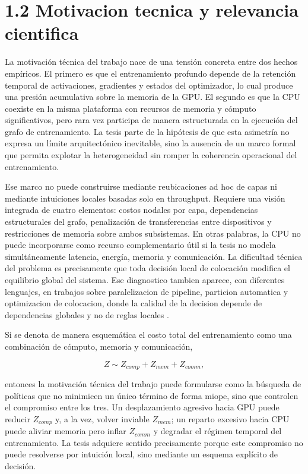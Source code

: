 \section{1.2 Motivacion tecnica y relevancia cientifica}
La motivación técnica del trabajo nace de una tensión concreta entre dos hechos empíricos. El primero es que el entrenamiento profundo depende de la retención temporal de activaciones, gradientes y estados del optimizador, lo cual produce una presión acumulativa sobre la memoria de la GPU. El segundo es que la CPU coexiste en la misma plataforma con recursos de memoria y cómputo significativos, pero rara vez participa de manera estructurada en la ejecución del grafo de entrenamiento. La tesis parte de la hipótesis de que esta asimetría no expresa un límite arquitectónico inevitable, sino la ausencia de un marco formal que permita explotar la heterogeneidad sin romper la coherencia operacional del entrenamiento.

Ese marco no puede construirse mediante reubicaciones ad hoc de capas ni mediante intuiciones locales basadas solo en throughput. Requiere una visión integrada de cuatro elementos: costos nodales por capa, dependencias estructurales del grafo, penalización de transferencias entre dispositivos y restricciones de memoria sobre ambos subsistemas. En otras palabras, la CPU no puede incorporarse como recurso complementario útil si la tesis no modela simultáneamente latencia, energía, memoria y comunicación. La dificultad técnica del problema es precisamente que toda decisión local de colocación modifica el equilibrio global del sistema. Ese diagnostico tambien aparece, con diferentes lenguajes, en trabajos sobre paralelizacion de pipeline, particion automatica y optimizacion de colocacion, donde la calidad de la decision depende de dependencias globales y no de reglas locales \cite{huang2019gpipe,narayanan2019pipedream,zheng2022alpa}.

Si se denota de manera esquemática el costo total del entrenamiento como una combinación de cómputo, memoria y comunicación,

$$
Z \sim Z_{comp} + Z_{mem} + Z_{comm},
$$

entonces la motivación técnica del trabajo puede formularse como la búsqueda de políticas que no minimicen un único término de forma miope, sino que controlen el compromiso entre los tres. Un desplazamiento agresivo hacia GPU puede reducir $Z_{comp}$ y, a la vez, volver inviable $Z_{mem}$; un reparto excesivo hacia CPU puede aliviar memoria pero inflar $Z_{comm}$ y degradar el régimen temporal del entrenamiento. La tesis adquiere sentido precisamente porque este compromiso no puede resolverse por intuición local, sino mediante un esquema explícito de decisión.

